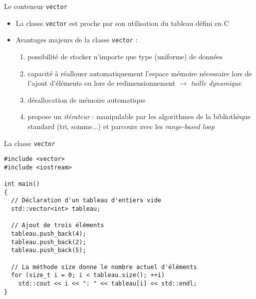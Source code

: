 \documentclass[c]{beamer}
\begin{document}

\begin{frame}[fragile]{Le conteneur \texttt{vector}}
 \begin{itemize}
\item La classe \texttt{vector} est proche par son utilisation du tableau défini en C

\item Avantages majeurs de la classe \texttt{vector} :

\begin{enumerate}
\item possibilité de stocker n'importe que type (uniforme) de données

\item capacité à réallouer automatiquement l'espace mémoire nécessaire lors de l'ajout d'éléments ou lors de redimensionnement $\rightarrow$ \emph{taille dynamique}

\item désallocation de mémoire automatique

\item propose un \emph{itérateur} : manipulable par les algorithmes de la bibliothèque standard (tri, somme...) et parcours avec les \emph{range-based loop}
\end{enumerate}
\end{itemize}
\end{frame}

\begin{frame}[fragile]{La classe \texttt{vector}}

\begin{verbatim}
#include <vector>
#include <iostream>

int main()
{
  // Déclaration d'un tableau d'entiers vide
  std::vector<int> tableau;

  // Ajout de trois éléments
  tableau.push_back(4);
  tableau.push_back(2);
  tableau.push_back(5);

  // La méthode size donne le nombre actuel d'éléments
  for (size_t i = 0; i < tableau.size(); ++i)
    std::cout << i << ": " << tableau[i] << std::endl;
}
\end{verbatim}
\end{frame}
\end{document}
